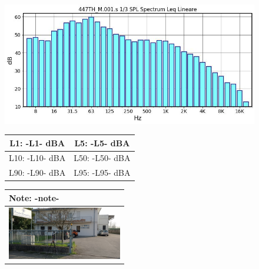 \documentclass[11pt]{article}
\begin{document}
\begin{figure}[!htb]
   \begin{minipage}{0.6\textwidth}
     \centering
     \includegraphics[width=1.\textwidth]{-SPL!plot-}

	\begin{center}
	\begin{tabular}{|c || c |} 
	 \hline
	 L1: -L1- dBA & L5: -L5- dBA \\ %
	 \hline
	L10: -L10- dBA & L50: -L50- dBA \\ 
	 \hline
	L90: -L90- dBA & L95: -L95- dBA \\ %
	\hline
	\end{tabular}
	\end{center}


	\end{minipage}\hfill
     \begin{minipage}{0.4\textwidth}
	\begin{center}
     	\begin{tabular}{ |p{}|} 
	 \hline
	 \textbf{Note}: \newline -note- \\ 
	 \hline
    \begin{minipage}{.5\textwidth}
    \vspace{1.2cm}
    \hspace{0.8cm}
	\centering
       \includegraphics[width=5cm]{-foto-H.jpg}
     \vspace{0.6cm}
        \end{minipage}	 \\
        	

\end{tabular}
\end{center}
\end{minipage}
\end{figure}
\end{document}
